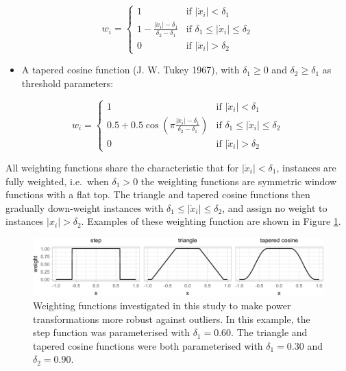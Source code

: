 \documentclass[preprint,12pt,authoryear]{elsarticle}
\begin{document}
\begin{equation}
w_i =
\begin{cases}
1 & \text{if } \left| \dot{x}_i \right| < \delta_1\\
1 - \frac{\left| \dot{x}_i \right| - \delta_1}{\delta_2 - \delta_1} & \text{if } \delta_1 \leq \left| \dot{x}_i \right| \leq \delta_2 \\
0 & \text{if } \left| \dot{x}_i \right| > \delta_2
\end{cases}
\end{equation}

\begin{itemize}
\item
  A tapered cosine function (J. W. Tukey 1967), with \(\delta_1 \geq 0\)
  and \(\delta_2 \geq \delta_1\) as threshold parameters:
\end{itemize}

\begin{equation}
w_i =
\begin{cases}
1 & \text{if } \left| \dot{x}_i \right| < \delta_1\\
0.5 + 0.5 \cos\left(\pi \frac{\left| \dot{x}_i \right| - \delta_1}{\delta_2 - \delta_1} \right) & \text{if } \delta_1 \leq \left| \dot{x}_i \right| \leq \delta_2 \\
0 & \text{if } \left| \dot{x}_i \right| > \delta_2
\end{cases}
\end{equation}

All weighting functions share the characteristic that for
\(\left| \dot{x}_i \right|< \delta_1\), instances are fully weighted,
i.e.~when \(\delta_1 > 0\) the weighting functions are symmetric window
functions with a flat top. The triangle and tapered cosine functions
then gradually down-weight instances with
\(\delta_1 \leq \left| \dot{x}_i \right| \leq \delta_2\), and assign no
weight to instances \(\left| x_i \right| > \delta_2\). Examples of these
weighting function are shown in Figure \ref{fig:weighting-functions}.

\begin{figure}

{\centering \includegraphics{figure_2} 

}

\caption{Weighting functions investigated in this study to make power transformations more robust against outliers. In this example, the step function was parameterised with $\delta_1 = 0.60$. The triangle and tapered cosine functions were both parameterised with $\delta_1 = 0.30$ and $\delta_2 = 0.90$.}\label{fig:weighting-functions}
\end{figure}
\end{document}

